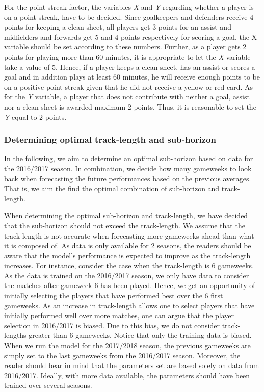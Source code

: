 For the point streak factor, the variables \textit{X} and \textit{Y} regarding whether a player is on a point streak, have to be decided. Since goalkeepers and defenders receive 4 points for keeping a clean sheet, all players get 3 points for an assist and midfielders and forwards get 5 and 4 points respectively for scoring a goal, the X variable should be set according to these numbers. Further, as a player gets 2 points for playing more than 60 minutes, it is appropriate to let the \textit{X} variable take a value of 5. Hence, if a player keeps a clean sheet, has an assist or scores a goal and in addition plays at least 60 minutes, he will receive enough points to be on a positive point streak given that he did not receive a yellow or red card. As for the \textit{Y} variable, a player that does not contribute with neither a goal, assist nor a clean sheet is awarded maximum 2 points. Thus, it is reasonable to set the \textit{Y} equal to 2 points. 


\subsubsection{Determining optimal track-length and sub-horizon}

In the following, we aim to determine an optimal sub-horizon based on data for the 2016/2017 season. In combination, we decide how many gameweeks to look back when forecasting the future performances based on the previous averages. That is, we aim the find the optimal combination of sub-horizon and track-length.

\newpar

When determining the optimal sub-horizon and track-length, we have decided that the sub-horizon should not exceed the track-length. We assume that the track-length is not accurate when forecasting more gameweeks ahead than what it is composed of. As data is only available for 2 seasons, the readers should be aware that the model's performance is expected to improve as the track-length increases. For instance, consider the case when the track-length is 6 gameweeks. As the data is trained on the 2016/2017 season, we only have data to consider the matches after gameweek 6 has been played. Hence, we get an opportunity of initially selecting the players that have performed best over the 6 first gameweeks. As an increase in track-length allows one to select players that have initially performed well over more matches, one can argue that the player selection in 2016/2017 is biased. Due to this bias, we do not consider track-lengths greater than 6 gameweeks. Notice that only the training data is biased. When we run the model for the 2017/2018 season, the previous gameweeks are simply set to the last gameweeks from the 2016/2017 season. Moreover, the reader should bear in mind that the parameters set are based solely on data from 2016/2017. Ideally, with more data available, the parameters should have been trained over several seasons.



